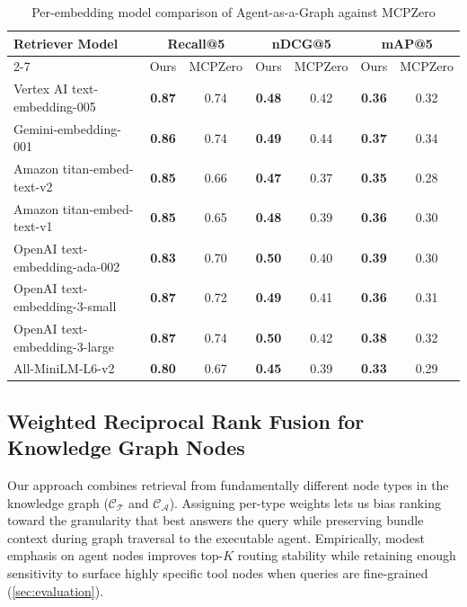 \documentclass[a4paper,twoside]{article}
\begin{document}
\begin{table}[t]
\centering
\caption{Per-embedding model comparison of Agent-as-a-Graph against MCPZero}
\label{tab:retriever_comparison}
\begingroup
\small
\setlength{\tabcolsep}{4pt}
\renewcommand{\arraystretch}{1.05}
\begin{tabular}{l|cc|cc|cc}
\hline
\textbf{Retriever Model} & 
\multicolumn{2}{c|}{\textbf{Recall@5}} & 
\multicolumn{2}{c|}{\textbf{nDCG@5}} & 
\multicolumn{2}{c}{\textbf{mAP@5}} \\ 
\cline{2-7}
 & Ours & MCPZero & Ours & MCPZero & Ours & MCPZero \\
\hline
\footnotesize{Vertex AI text-embedding-005} & \textbf{0.87} & 0.74 & \textbf{0.48} & 0.42 & \textbf{0.36} & 0.32 \\
\footnotesize{Gemini-embedding-001} & \textbf{0.86} & 0.74 & \textbf{0.49} & 0.44 & \textbf{0.37} & 0.34 \\
\footnotesize{Amazon titan-embed-text-v2} & \textbf{0.85} & 0.66 & \textbf{0.47} & 0.37 & \textbf{0.35} & 0.28 \\
\footnotesize{Amazon titan-embed-text-v1} & \textbf{0.85} & 0.65 & \textbf{0.48} & 0.39 & \textbf{0.36} & 0.30 \\
\footnotesize{OpenAI text-embedding-ada-002} & \textbf{0.83} & 0.70 & \textbf{0.50} & 0.40 & \textbf{0.39} & 0.30 \\
\footnotesize{OpenAI text-embedding-3-small} & \textbf{0.87} & 0.72 & \textbf{0.49} & 0.41 & \textbf{0.36} & 0.31 \\
\footnotesize{OpenAI text-embedding-3-large} & \textbf{0.87} & 0.74 & \textbf{0.50} & 0.42 & \textbf{0.38} & 0.32 \\
\footnotesize{All-MiniLM-L6-v2} & \textbf{0.80} & 0.67 & \textbf{0.45} & 0.39 & \textbf{0.33} & 0.29 \\
\hline
\end{tabular}
\endgroup
\end{table}

\subsection{Weighted Reciprocal Rank Fusion for Knowledge Graph Nodes}\label{subsec:wrrf}

Our approach combines retrieval from fundamentally different node types in the knowledge graph (\(\mathcal{C_T}\) and \(\mathcal{C_A}\)). Assigning per-type weights lets us bias ranking toward the granularity that best answers the query while preserving bundle context during graph traversal to the executable agent. Empirically, modest emphasis on agent nodes improves top-\(K\) routing stability while retaining enough sensitivity to surface highly specific tool nodes when queries are fine-grained (\ref{sec:evaluation}).
\end{document}
